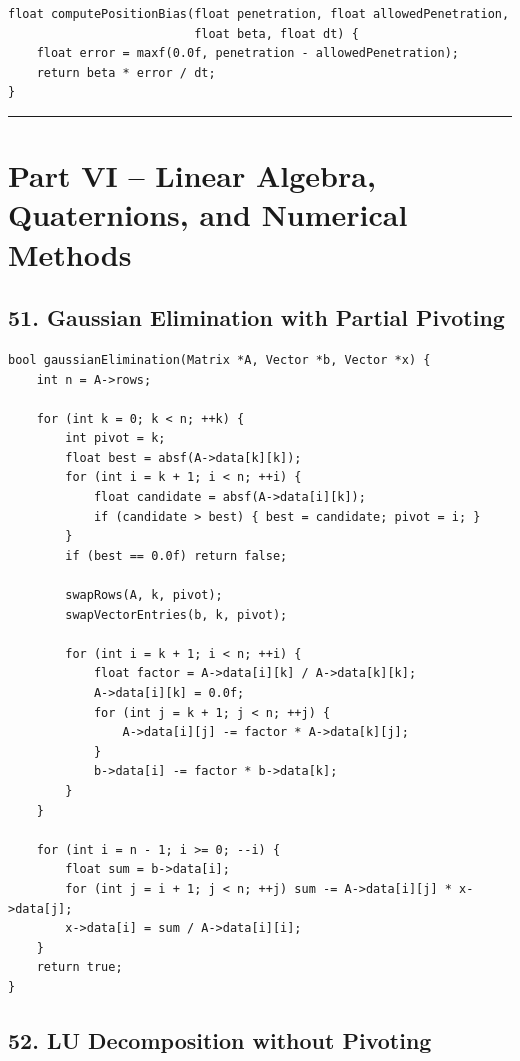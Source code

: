 \documentclass[10pt,letterpaper]{article}
\begin{document}
\begin{verbatim}
float computePositionBias(float penetration, float allowedPenetration,
                          float beta, float dt) {
    float error = maxf(0.0f, penetration - allowedPenetration);
    return beta * error / dt;
}
\end{verbatim}

\medskip\hrule\medskip

\clearpage
\section*{Part VI -- Linear Algebra, Quaternions, and Numerical Methods}

\subsection*{51. Gaussian Elimination with Partial Pivoting}

\begin{verbatim}
bool gaussianElimination(Matrix *A, Vector *b, Vector *x) {
    int n = A->rows;

    for (int k = 0; k < n; ++k) {
        int pivot = k;
        float best = absf(A->data[k][k]);
        for (int i = k + 1; i < n; ++i) {
            float candidate = absf(A->data[i][k]);
            if (candidate > best) { best = candidate; pivot = i; }
        }
        if (best == 0.0f) return false;

        swapRows(A, k, pivot);
        swapVectorEntries(b, k, pivot);

        for (int i = k + 1; i < n; ++i) {
            float factor = A->data[i][k] / A->data[k][k];
            A->data[i][k] = 0.0f;
            for (int j = k + 1; j < n; ++j) {
                A->data[i][j] -= factor * A->data[k][j];
            }
            b->data[i] -= factor * b->data[k];
        }
    }

    for (int i = n - 1; i >= 0; --i) {
        float sum = b->data[i];
        for (int j = i + 1; j < n; ++j) sum -= A->data[i][j] * x->data[j];
        x->data[i] = sum / A->data[i][i];
    }
    return true;
}
\end{verbatim}

\subsection*{52. LU Decomposition without Pivoting}
\end{document}
